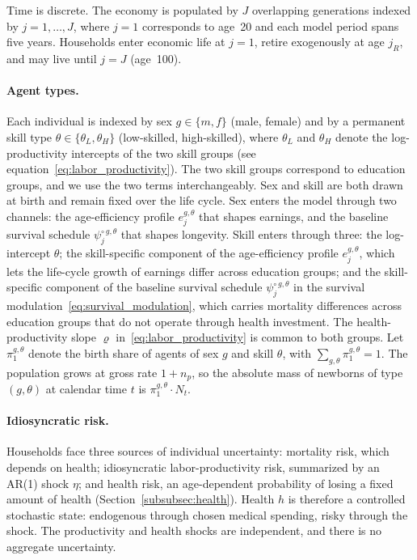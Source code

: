 \documentclass[12pt,a4paper]{article}
\begin{document}
Time is discrete. The economy is populated by $J$ overlapping generations indexed by $j = 1, \ldots, J$, where $j = 1$ corresponds to age~20 and each model period spans five years. Households enter economic life at $j = 1$, retire exogenously at age $j_R$, and may live until $j = J$ (age~100).

\paragraph{Agent types.}
Each individual is indexed by sex $g \in \{m, f\}$ (male, female) and by a permanent skill type $\theta \in \{\theta_L, \theta_H\}$ (low-skilled, high-skilled), where $\theta_L$ and $\theta_H$ denote the log-productivity intercepts of the two skill groups (see equation~\eqref{eq:labor_productivity}). The two skill groups correspond to education groups, and we use the two terms interchangeably. Sex and skill are both drawn at birth and remain fixed over the life cycle. Sex enters the model through two channels: the age-efficiency profile $e^{g,\theta}_j$ that shapes earnings, and the baseline survival schedule $\psi^{\circ\, g,\theta}_j$ that shapes longevity. Skill enters through three: the log-intercept $\theta$; the skill-specific component of the age-efficiency profile $e^{g,\theta}_j$, which lets the life-cycle growth of earnings differ across education groups; and the skill-specific component of the baseline survival schedule $\psi^{\circ\, g,\theta}_j$ in the survival modulation~\eqref{eq:survival_modulation}, which carries mortality differences across education groups that do not operate through health investment. The health-productivity slope $\varrho$ in~\eqref{eq:labor_productivity} is common to both groups. Let $\pi^{g,\theta}_1$ denote the birth share of agents of sex $g$ and skill $\theta$, with $\sum_{g,\theta} \pi^{g,\theta}_1 = 1$. The population grows at gross rate $1 + n_p$, so the absolute mass of newborns of type $(g,\theta)$ at calendar time $t$ is $\pi^{g,\theta}_1 \cdot N_t$.

\paragraph{Idiosyncratic risk.}
Households face three sources of individual uncertainty: mortality risk, which depends on health; idiosyncratic labor-productivity risk, summarized by an AR(1) shock $\eta$; and health risk, an age-dependent probability of losing a fixed amount of health (Section~\ref{subsubsec:health}). Health $h$ is therefore a controlled stochastic state: endogenous through chosen medical spending, risky through the shock. The productivity and health shocks are independent, and there is no aggregate uncertainty.
\end{document}
